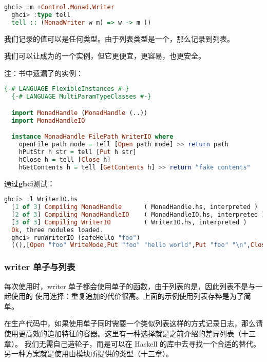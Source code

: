\documentclass[./main.tex]{subfiles}
\begin{document}
\begin{lstlisting}[language=Haskell]
  ghci> :m +Control.Monad.Writer
  ghci> :type tell
  tell :: (MonadWriter w m) => w -> m ()
\end{lstlisting}

我们记录的值可以是任何类型。由于列表类型是一个，那么记录到列表。

我们可以让成为的一个实例，但它更便宜，更容易，也更安全。

注：书中遗漏了的实例：

\begin{lstlisting}[language=Haskell]
  {-# LANGUAGE FlexibleInstances #-}
  {-# LANGUAGE MultiParamTypeClasses #-}

  import MonadHandle (MonadHandle (..))
  import MonadHandleIO

  instance MonadHandle FilePath WriterIO where
    openFile path mode = tell [Open path mode] >> return path
    hPutStr h str = tell [Put h str]
    hClose h = tell [Close h]
    hGetContents h = tell [GetContents h] >> return "fake contents"
\end{lstlisting}

通过\textbf{ghci}测试：

\begin{lstlisting}[language=Haskell]
  ghci> :l WriterIO.hs
  [1 of 3] Compiling MonadHandle      ( MonadHandle.hs, interpreted )
  [2 of 3] Compiling MonadHandleIO    ( MonadHandleIO.hs, interpreted )
  [3 of 3] Compiling WriterIO         ( WriterIO.hs, interpreted )
  Ok, three modules loaded.
  ghci> runWriterIO (safeHello "foo")
  ((),[Open "foo" WriteMode,Put "foo" "hello world",Put "foo" "\n",Close "foo"])
\end{lstlisting}

\subsubsection*{writer 单子与列表}

每次使用时，writer 单子都会使用单子的函数，由于列表的是\acode{(++)}，因此列表不是与一起使用的
使用选择：重复追加的代价很高。上面的示例使用列表存粹是为了简单。

在生产代码中，如果使用单子同时需要一个类似列表这样的方式记录日志，那么请使用更高效的追加特征的容器。这里有一种选择就是之前介绍的差异列表（十三章）。
我们无需自己造轮子，而是可以在 Haskell 的库中去寻找一个合适的替代。另一种方案就是使用由模块所提供的类型（十三章）。
\end{document}
